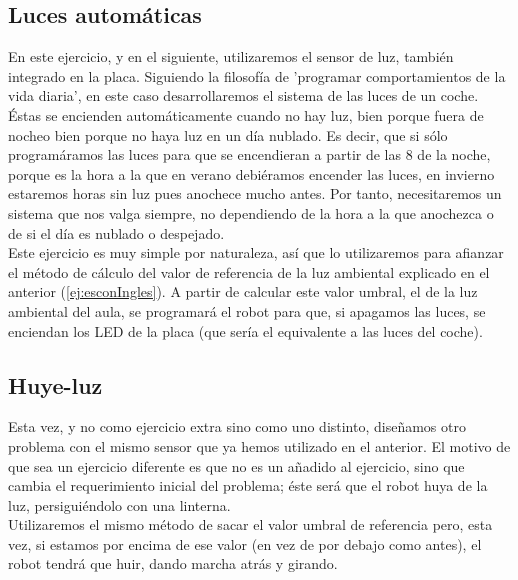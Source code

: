 \subsection{Luces automáticas}\label{ej:lucesAuto}
En este ejercicio, y en el siguiente, utilizaremos el sensor de luz, también integrado en la placa. Siguiendo la filosofía de 'programar comportamientos de la vida diaria', en este caso desarrollaremos el sistema de las luces de un coche. Éstas se encienden automáticamente cuando no hay luz, bien porque fuera de nocheo bien porque no haya luz en un día nublado. Es decir, que si sólo programáramos las luces para que se encendieran a partir de las 8 de la noche, porque es la hora a la que en verano debiéramos encender las luces, en invierno estaremos horas sin luz pues anochece mucho antes. Por tanto, necesitaremos un sistema que nos valga siempre, no dependiendo de la hora a la que anochezca o de si el día es nublado o despejado. \\
Este ejercicio es muy simple por naturaleza, así que lo utilizaremos para afianzar el método de cálculo del valor de referencia de la luz ambiental explicado en el anterior (\ref{ej:esconIngles}). A partir de calcular este valor umbral, el de la luz ambiental del aula, se programará el robot para que, si apagamos las luces, se enciendan los LED de la placa (que sería el equivalente a las luces del coche).\\

\subsection{Huye-luz}\label{ej:huyeLuz}
Esta vez, y no como ejercicio extra sino como uno distinto, diseñamos otro problema con el mismo sensor que ya hemos utilizado en el anterior. El motivo de que sea un ejercicio diferente es que no es un añadido al ejercicio, sino que cambia el requerimiento inicial del problema; éste será que el robot huya de la luz, persiguiéndolo con una linterna.\\
Utilizaremos el mismo método de sacar el valor umbral de referencia pero, esta vez, si estamos por encima de ese valor (en vez de por debajo como antes), el robot tendrá que huir, dando marcha atrás y girando.\\

